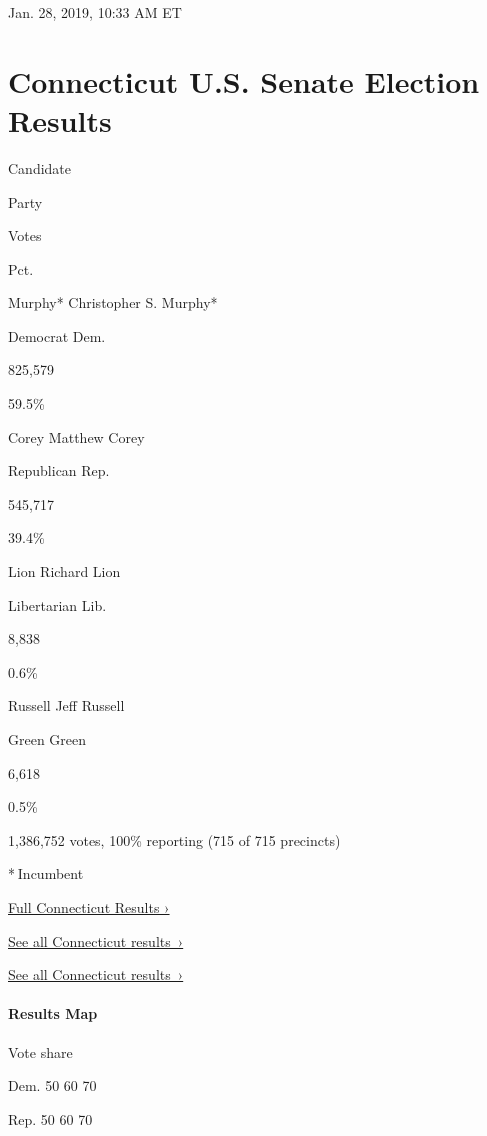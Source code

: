 Jan. 28, 2019, 10:33 AM ET

\hypertarget{connecticut-us-senate-election-results}{%
\section{Connecticut U.S. Senate Election
Results}\label{connecticut-us-senate-election-results}}

Candidate

Party

Votes

Pct.

 Murphy* Christopher S. Murphy*

Democrat Dem.

825,579

59.5\%

 Corey Matthew Corey

Republican Rep.

545,717

39.4\%

 Lion Richard Lion

Libertarian Lib.

8,838

0.6\%

 Russell Jeff Russell

Green Green

6,618

0.5\%

1,386,752 votes, 100\% reporting (715 of 715 precincts)

* Incumbent

\href{https://www.nytimes3xbfgragh.onion/interactive/2018/11/06/us/elections/results-connecticut-elections.html}{Full
Connecticut Results ›}

\href{https://www.nytimes3xbfgragh.onion/interactive/2018/11/06/us/elections/results-connecticut-elections.html}{See
all Connecticut results~›}

\href{https://www.nytimes3xbfgragh.onion/interactive/2018/11/06/us/elections/results-connecticut-elections.html}{See
all Connecticut results~›}

\hypertarget{results-map}{%
\paragraph{Results Map}\label{results-map}}

Vote share

Dem. 50 60 70

Rep. 50 60 70

